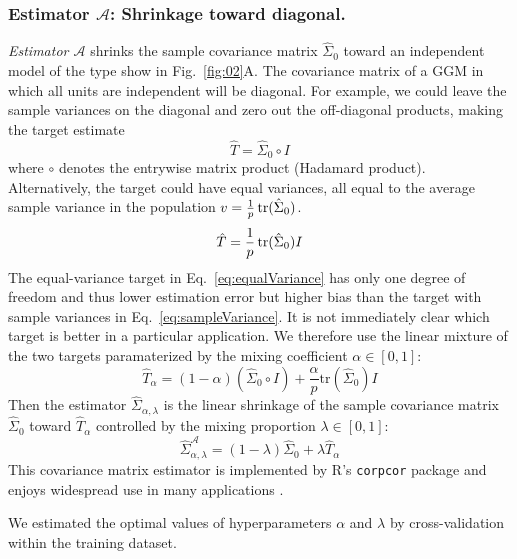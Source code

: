 \subsubsection*{Estimator $\mathcal A$: Shrinkage toward diagonal.}
\emph{Estimator $\mathcal A$} shrinks the sample covariance matrix $\hat\Sigma_0$ toward an independent model of the type show in Fig.~\ref{fig:02}A.  The covariance matrix of a GGM in which all units are independent will be diagonal.  
For example, we  could leave the sample variances on the diagonal and zero out the off-diagonal products, making the target estimate 
\begin{equation}\label{eq:sampleVariance}
\hat T= \hat\Sigma_0\circ I
\end{equation}
where $\circ$ denotes the entrywise matrix product (Hadamard product). 
Alternatively, the target could have equal variances, all equal to the average sample variance in the population $v = \frac 1 p \operatorname{tr}(\hat\Sigma_0)$.
\begin{equation}\label{eq:equalVariance}
\hat T=\frac 1 p \operatorname{tr}(\hat\Sigma_0) I
\end{equation}
The equal-variance target in Eq.~\ref{eq:equalVariance} has only one degree of freedom and thus lower estimation error but higher bias than the target with sample variances in Eq.~\ref{eq:sampleVariance}. It is not immediately clear which target is better in a particular application. We therefore use the linear mixture of the two targets paramaterized by the mixing coefficient $\alpha\in[0,1]$:
\begin{equation}
\hat T_\alpha = (1-\alpha)(\hat\Sigma_0 \circ I) + \frac \alpha p \mbox{tr}(\hat \Sigma_0)I
\end{equation}
Then the estimator $\hat\Sigma_{\alpha,\lambda}$ is the linear shrinkage of the sample covariance matrix $\hat\Sigma_0$ toward $\hat T_\alpha$ controlled by the mixing proportion $\lambda\in[0,1]$:
\begin{equation}
\hat\Sigma_{\alpha,\lambda}^\mathcal{A} = (1-\lambda)\hat\Sigma_0 + \lambda\hat T_\alpha 
\end{equation}
This covariance matrix estimator is implemented by R's {\tt corpcor} package \cite{Schaefer:2010} and enjoys widespread use in many applications \cite{Schafer:2005}.

We estimated the optimal values of hyperparameters $ \alpha$ and $ \lambda$  by  cross-validation within the training dataset.  

